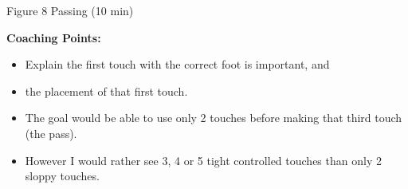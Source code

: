 \begin{evenBlock}{Figure 8 Passing (10 min)}
\begin{minipage}[t]{\linewidth}
\begin{minipage}{.6\linewidth}
        \textbf{Coaching Points:}
        \begin{itemize}
            \setlength{\itemsep}{0pt}
            \setlength{\parskip}{0pt}
            \setlength{\parsep}{0pt}
            \item Explain the first touch with the correct foot is important, and
            \item the placement of that first touch.
            \item The goal would be able to use only 2 touches before making that third touch (the pass). 
            \item However I would rather see 3, 4 or 5 tight controlled touches than only 2 sloppy touches.
        \end{itemize}

    \end{minipage}
\end{minipage}

\end{evenBlock}